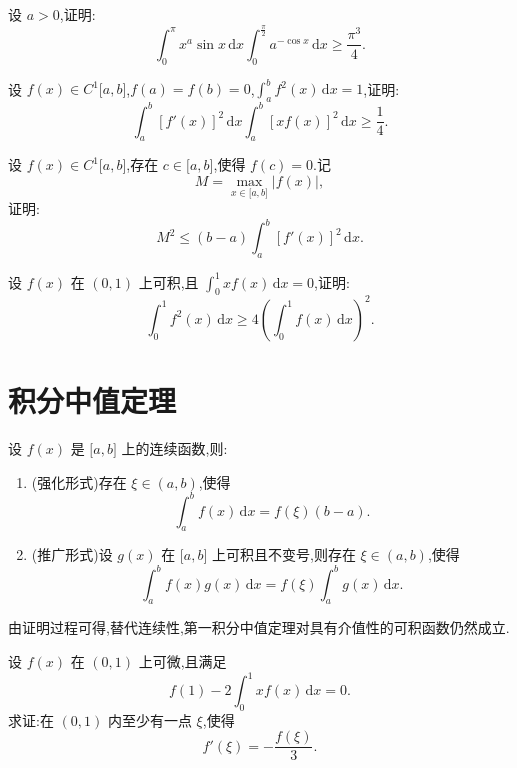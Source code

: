 \documentclass[../数学分析培优讲义.tex]{subfiles}
\begin{document}
\begin{example}
设 $a>0$,证明:
\[
    \int_0^\pi x^a\sin x\,\mathrm{d}x
    \int_0^{\frac{\pi}{2}}a^{-\cos x}\,\mathrm{d}x
    \geq\dfrac{\pi^3}{4}.
\]
\end{example}
\exampleblank

\begin{example}
设 $f(x)\in C^1\lbrack a,b\rbrack$,$f(a)=f(b)=0$,$\displaystyle\int_a^bf^2(x)\,\mathrm{d}x=1$,证明:
\[
    \int_a^b[f'(x)]^2\,\mathrm{d}x
    \int_a^b[xf(x)]^2\,\mathrm{d}x
    \geq\dfrac{1}{4}.
\]
\end{example}
\exampleblank

\begin{example}
设 $f(x)\in C^1\lbrack a,b\rbrack$,存在 $c\in\lbrack a,b\rbrack$,使得 $f(c)=0$.记
\[
    M=\max\limits_{x\in\lbrack a,b\rbrack}|f(x)|,
\]
证明:
\[
    M^2\leq(b-a)\int_a^b[f'(x)]^2\,\mathrm{d}x.
\]
\end{example}
\exampleblank

\begin{example}
设 $f(x)$ 在 $(0,1)$ 上可积,且 $\displaystyle\int_0^1xf(x)\,\mathrm{d}x=0$,证明:
\[
    \int_0^1f^2(x)\,\mathrm{d}x
    \geq4\left(\int_0^1f(x)\,\mathrm{d}x\right)^2.
\]
\end{example}
\exampleblank


\newpage

\section{积分中值定理}

\begin{theorem}
设 $f(x)$ 是 $\lbrack a,b\rbrack$ 上的连续函数,则:
\begin{enumerate}[label=(\arabic*)]
    \item (强化形式)存在 $\xi\in(a,b)$,使得
    \[
        \int_a^bf(x)\,\mathrm{d}x=f(\xi)(b-a).
    \]
    \item (推广形式)设 $g(x)$ 在 $\lbrack a,b\rbrack$ 上可积且不变号,则存在 $\xi\in(a,b)$,使得
    \[
        \int_a^bf(x)g(x)\,\mathrm{d}x
        =f(\xi)\int_a^bg(x)\,\mathrm{d}x.
    \]
\end{enumerate}
\end{theorem}

\begin{remark}
由证明过程可得,替代连续性,第一积分中值定理对具有介值性的可积函数仍然成立.
\end{remark}

\begin{example}
设 $f(x)$ 在 $(0,1)$ 上可微,且满足
\[
    f(1)-2\int_0^1xf(x)\,\mathrm{d}x=0.
\]
求证:在 $(0,1)$ 内至少有一点 $\xi$,使得
\[
    f'(\xi)=-\dfrac{f(\xi)}{3}.
\]
\end{example}
\exampleblank
\end{document}
